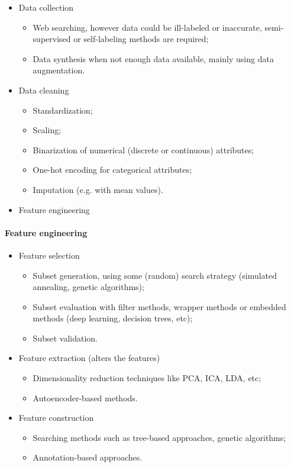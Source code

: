 \begin{itemize}
    \item Data collection
    \begin{itemize}
        \item Web searching, however data could be ill-labeled or inaccurate, semi-supervised or self-labeling methods are required;
        \item Data synthesis when not enough data available, mainly using data augmentation.
    \end{itemize}
    \item Data cleaning
    \begin{itemize}
        \item Standardization;
        \item Scaling;
	    \item Binarization of numerical (discrete or continuous) attributes;
	    \item One-hot encoding for categorical attributes;
	    \item Imputation (e.g. with mean values).
    \end{itemize}
    \item Feature engineering
\end{itemize}

\paragraph{Feature engineering}

\begin{itemize}
    \item Feature selection
    \begin{itemize}
        \item Subset generation, using some (random) search strategy (simulated annealing, genetic algorithms);
        \item Subset evaluation with filter methods, wrapper methods or embedded methods (deep learning, decision trees, etc);
        \item Subset validation.
    \end{itemize}
    \item Feature extraction (alters the features)
    \begin{itemize}
        \item Dimensionality reduction techniques like PCA, ICA, LDA, etc;
        \item Autoencoder-based methods.
    \end{itemize}
    \item Feature construction
    \begin{itemize}
        \item Searching methods such as tree-based approaches, genetic algorithms;
        \item Annotation-based approaches.
    \end{itemize}
\end{itemize}

